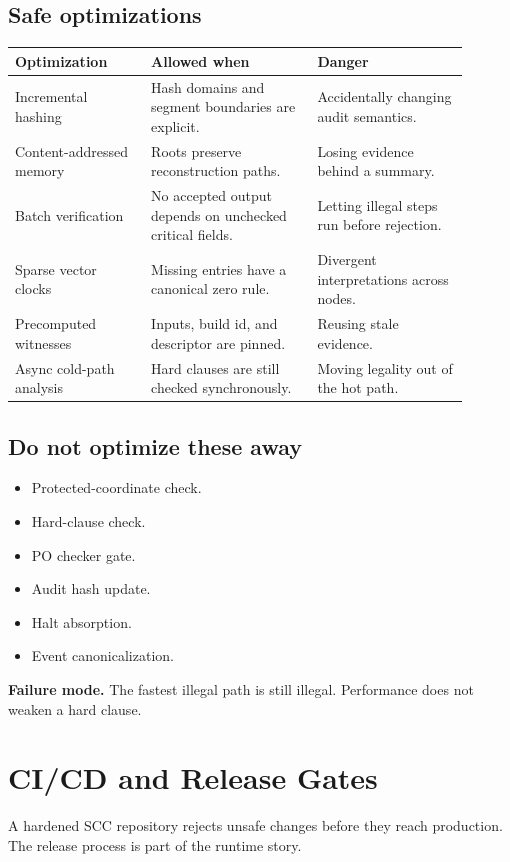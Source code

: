 \documentclass[11pt,oneside]{article}
\newenvironment{warnbox}{\begin{shaded}\noindent\textbf{Failure mode.} }{\end{shaded}}
\begin{document}
\subsection{Safe optimizations}
\begin{longtable}{@{}p{0.27\linewidth}p{0.33\linewidth}p{0.30\linewidth}@{}}
\toprule
\textbf{Optimization} & \textbf{Allowed when} & \textbf{Danger} \\
\midrule
Incremental hashing & Hash domains and segment boundaries are explicit. & Accidentally changing audit semantics. \\
Content-addressed memory & Roots preserve reconstruction paths. & Losing evidence behind a summary. \\
Batch verification & No accepted output depends on unchecked critical fields. & Letting illegal steps run before rejection. \\
Sparse vector clocks & Missing entries have a canonical zero rule. & Divergent interpretations across nodes. \\
Precomputed witnesses & Inputs, build id, and descriptor are pinned. & Reusing stale evidence. \\
Async cold-path analysis & Hard clauses are still checked synchronously. & Moving legality out of the hot path. \\
\bottomrule
\end{longtable}

\subsection{Do not optimize these away}
\begin{itemize}
\item Protected-coordinate check.
\item Hard-clause check.
\item PO checker gate.
\item Audit hash update.
\item Halt absorption.
\item Event canonicalization.
\end{itemize}

\begin{warnbox}
The fastest illegal path is still illegal. Performance does not weaken a hard clause.
\end{warnbox}



\section{CI/CD and Release Gates}
A hardened SCC repository rejects unsafe changes before they reach production. The release process is part of the runtime story.
\end{document}
